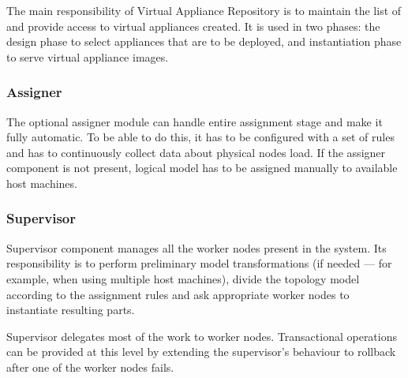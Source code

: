 \documentclass[11pt]{book}
\begin{document}
          The main responsibility of Virtual Appliance Repository is to maintain the list of and provide access to
          virtual appliances created. It is used in two phases: the design phase to select appliances that are to be
          deployed, and instantiation phase to serve virtual appliance images. \\

          \noindent
          \begin{minipage}{\textwidth}
            
          \end{minipage}
          

        \subsubsection{Assigner}

          The optional assigner module can handle entire assignment stage and make it fully automatic. To be able to do
          this, it has to be configured with a set of rules and has to continuously collect data about physical nodes
          load. If the assigner component is not present, logical model has to be assigned manually to available host
          machines.


        \subsubsection{Supervisor}

          Supervisor component manages all the worker nodes present in the system. Its responsibility is to perform
          preliminary model transformations (if needed --- for example, when using multiple host machines), divide the
          topology model according to the assignment rules and ask appropriate worker nodes to instantiate resulting
          parts.

          Supervisor delegates most of the work to worker nodes. Transactional operations can be provided at this level
          by extending the supervisor's behaviour to rollback after one of the worker nodes fails. \\

          \noindent
          \begin{minipage}{\textwidth}
            
          \end{minipage}
\end{document}
